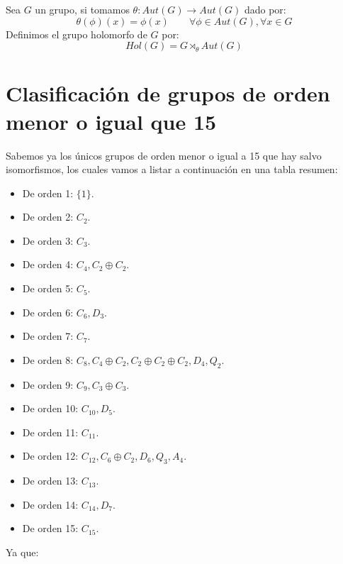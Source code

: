 \begin{definicion}
    Sea $G$ un grupo, si tomamos $\theta:Aut(G)\to Aut(G)$ dado por:
    \begin{equation*}
        \theta(\phi)(x) = \phi(x) \qquad \forall \phi \in Aut(G), \forall x\in G
    \end{equation*}
    Definimos el grupo holomorfo de $G$ por:
    \begin{equation*}
        Hol(G) = G\rtimes_\theta Aut(G)
    \end{equation*}
\end{definicion}

\section{Clasificación de grupos de orden menor o igual que 15}
\noindent
Sabemos ya los únicos grupos de orden menor o igual a 15 que hay salvo isomorfismos, los cuales vamos a listar a continuación en una tabla resumen:
\begin{itemize}
    \item De orden 1: $\{1\}$.
    \item De orden 2: $C_2$.
    \item De orden 3: $C_3$.
    \item De orden 4: $C_4, C_2\oplus C_2$.
    \item De orden 5: $C_5$.
    \item De orden 6: $C_6, D_3$.
    \item De orden 7: $C_7$.
    \item De orden 8: $C_8, C_4\oplus C_2, C_2\oplus C_2\oplus C_2, D_4, Q_2$.
    \item De orden 9: $C_9, C_3\oplus C_3$.
    \item De orden 10: $C_{10}, D_5$.
    \item De orden 11: $C_{11}$.
    \item De orden 12: $C_{12}, C_6\oplus C_2, D_6, Q_3, A_4$.
    \item De orden 13: $C_{13}$.
    \item De orden 14: $C_{14}, D_7$.
    \item De orden 15: $C_{15}$.
\end{itemize}
Ya que:
